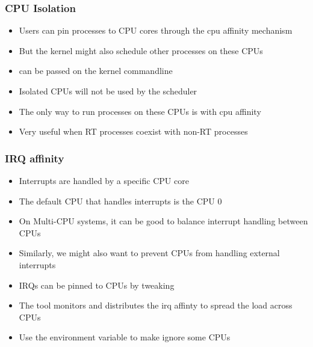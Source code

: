 \begin{frame}
	\frametitle{CPU Isolation}
	\begin{itemize}
		\item Users can pin processes to CPU cores through the cpu affinity mechanism
		\item But the kernel might also schedule other processes on these CPUs
		\item {} can be passed on the kernel commandline
		\item Isolated CPUs will not be used by the scheduler
		\item The only way to run processes on these CPUs is with cpu affinity
		\item Very useful when RT processes coexist with non-RT processes
	\end{itemize}
\end{frame}

\begin{frame}
	\frametitle{IRQ affinity}
	\begin{itemize}
		\item Interrupts are handled by a specific CPU core
		\item The default CPU that handles interrupts is the CPU 0
		\item On Multi-CPU systems, it can be good to balance interrupt handling between CPUs
		\item Similarly, we might also want to prevent CPUs from handling external interrupts
		\item IRQs can be pinned to CPUs by tweaking 
		\item The  tool monitors and distributes the irq affinty to spread the load across CPUs
		\item Use the  environment variable to make  ignore some CPUs
	\end{itemize}
\end{frame}



